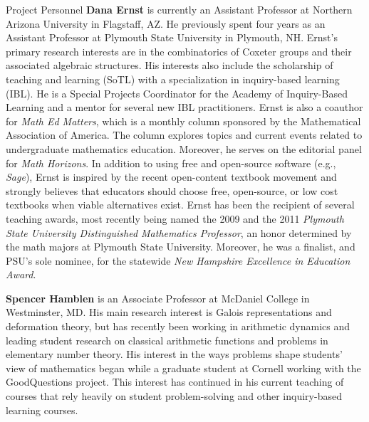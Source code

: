 \documentclass[11pt]{article}
\begin{document}
\begin{section}{Project Personnel}
\textbf{Dana Ernst} is currently an Assistant Professor at Northern
Arizona University in Flagstaff, AZ. He previously spent four years as an
Assistant Professor at Plymouth State University in Plymouth, NH. Ernst's
primary research interests are in the combinatorics of Coxeter groups and
their associated algebraic structures.  His interests also include the
scholarship of teaching and learning (SoTL) with a specialization in
inquiry-based learning (IBL). He is a Special Projects Coordinator for the
Academy of Inquiry-Based Learning and a mentor for several new IBL
practitioners. Ernst is also a coauthor for \emph{Math Ed Matters}, which
is a monthly column sponsored by the Mathematical Association of
America. The column explores topics and current events related to
undergraduate mathematics education. Moreover, he serves on the editorial
panel for \emph{Math Horizons}.  In addition to using free and open-source 
software (e.g., \emph{Sage}), Ernst is inspired by the recent
open-content textbook movement and strongly believes that educators should
choose free, open-source, or low cost textbooks when viable alternatives
exist.  Ernst has been the recipient of several teaching awards, most
recently being named the 2009 and the 2011 \emph{Plymouth State University
Distinguished Mathematics Professor}, an honor determined by the math
majors at Plymouth State University.  Moreover, he was a
finalist, and PSU's sole nominee, for the statewide \emph{New Hampshire
Excellence in Education Award}.

\textbf{Spencer Hamblen} is an Associate Professor at McDaniel College in
Westminster, MD.  His main research interest is Galois representations and
deformation theory, but has recently been working in arithmetic dynamics
and leading student research on classical arithmetic functions and problems 
in elementary number theory.  His interest in the ways problems shape 
students' view of mathematics began while a graduate student at Cornell 
working with the GoodQuestions project.  This interest has continued in his 
current teaching of courses that rely heavily on student problem-solving 
and other inquiry-based learning courses.


\end{section}
\end{document}
